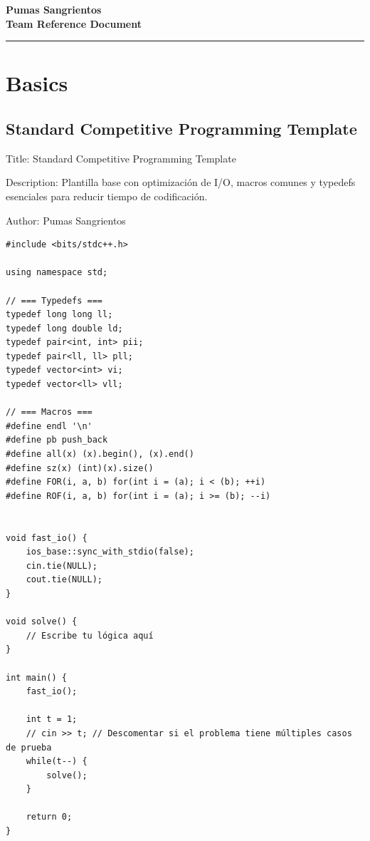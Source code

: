 \documentclass[10pt,landscape,twocolumn]{article}
\begin{document}
\begin{center}
    \LARGE \textbf{Pumas Sangrientos} \\
    \large \textbf{Team Reference Document}
\end{center}

\tableofcontents
\vspace{0.1cm}
\hrule
\vspace{0.2cm}





\section{Basics}

\subsection{Standard Competitive Programming Template}
\begin{flushleft}
\footnotesize\ttfamily
\par\noindent Title: Standard Competitive Programming Template
\par\noindent Description: Plantilla base con optimización de I/O, macros comunes y typedefs esenciales para reducir tiempo de codificación.
\par\noindent Author: Pumas Sangrientos
\end{flushleft}

\begin{lstlisting}
#include <bits/stdc++.h>

using namespace std;

// === Typedefs ===
typedef long long ll;
typedef long double ld;
typedef pair<int, int> pii;
typedef pair<ll, ll> pll;
typedef vector<int> vi;
typedef vector<ll> vll;

// === Macros ===
#define endl '\n'
#define pb push_back
#define all(x) (x).begin(), (x).end()
#define sz(x) (int)(x).size()
#define FOR(i, a, b) for(int i = (a); i < (b); ++i)
#define ROF(i, a, b) for(int i = (a); i >= (b); --i)


void fast_io() {
    ios_base::sync_with_stdio(false);
    cin.tie(NULL);
    cout.tie(NULL);
}

void solve() {
    // Escribe tu lógica aquí
}

int main() {
    fast_io();

    int t = 1;
    // cin >> t; // Descomentar si el problema tiene múltiples casos de prueba
    while(t--) {
        solve();
    }

    return 0;
}
\end{lstlisting}
\end{document}
